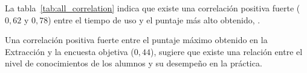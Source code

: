 La tabla~\ref{tab:all_correlation} indica que existe una correlación positiva
fuerte ($0,62$ y $0,78$) entre el tiempo de uso y el puntaje más alto obtenido,
. 

Una correlación positiva fuerte entre el puntaje máximo obtenido en la
Extracción y la encuesta objetiva ($0,44$), sugiere que existe una relación entre
el nivel de conocimientos de los alumnos y su desempeño en la práctica.
